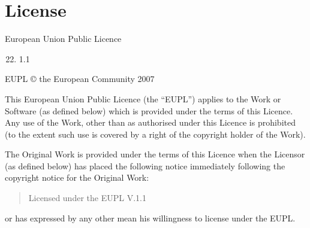 \documentclass[letterpaper,10pt,english]{sphinxmanual}
\begin{document}
\chapter{License}
\label{license::doc}\label{license:license}
European Union Public Licence
\begin{enumerate}
\setcounter{enumi}{21}
\item {} 
1.1

\end{enumerate}

EUPL © the European Community 2007

This European Union Public Licence (the “EUPL”) applies to the Work or Software
(as defined below) which is provided under the terms of this Licence. Any use of the
Work, other than as authorised under this Licence is prohibited (to the extent such use
is covered by a right of the copyright holder of the Work).

The Original Work is provided under the terms of this Licence when the Licensor (as
defined below) has placed the following notice immediately following the copyright
notice for the Original Work:
\begin{quote}

Licensed under the EUPL V.1.1
\end{quote}

or has expressed by any other mean his willingness to license under the EUPL.
\end{document}
